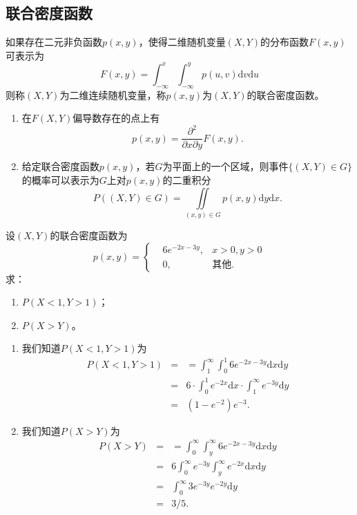 \subsection{联合密度函数}
 \begin{definition}
 如果存在二元非负函数$p(x,y)$，使得二维随机变量$(X,Y)$的分布函数$F(x,y)$可表示为$$F(x, y)=\int_{-\infty}^{x} \int_{-\infty}^{y} p(u, v) \text{d} v \text{d} u$$
 则称$(X,Y)$为二维连续随机变量，称$p(x,y)$为$(X,Y)$的联合密度函数。
  \end{definition}
  \begin{remark}
  \begin{enumerate}
      \item 在$F(X,Y)$偏导数存在的点上有
      $$p(x, y)=\frac{\partial^{2}}{\partial x \partial y} F(x, y) .$$
      \item 给定联合密度函数$p(x,y)$，若$G$为平面上的一个区域，则事件$\{(X,Y)\in G\}$的概率可以表示为$G$上对$p(x,y)$的二重积分
      $$
      P((X,Y) \in G)  = \underset{(x,y)\in G}{\iint} p(x,y)\text{d} y \text{d} x.
      $$
  \end{enumerate}
  \end{remark}
  \begin{example}
      设$(X,Y)$的联合密度函数为
      $$
      p(x,y) = \left\{
      \begin{aligned}
          & 6 e^{-2x - 3y}, & x>0,y>0\\
          &0 , & \text{其他}.
      \end{aligned}
      \right.
      $$
      求：
      \begin{enumerate}
          \item $P(X<1,Y>1)$；
          \item $P(X>Y)$。
      \end{enumerate}
  \end{example}
  \begin{solution}
       \begin{enumerate}
          \item 我们知道$P(X<1,Y>1)$为
          \begin{eqnarray*}
              P(X<1,Y>1) &=&= \int_{1}^{\infty}\int_{0}^1 6 e^{-2x - 3y} \text{d}x \text{d}y\\
              &=& 6\cdot \int_{0}^1 e^{-2x}\text{d}x \cdot \int_{1}^{\infty} e^{-3y}\text{d}y\\
              &=& (1-e^{-2})e^{-3}.
          \end{eqnarray*}
          \item 我们知道$P(X>Y)$为
          \begin{eqnarray*}
              P(X>Y) &=&= \int_{0}^{\infty}\int_{y}^\infty 6 e^{-2x - 3y} \text{d}x \text{d}y\\
              &=& 6\int_{0}^{\infty}e^{- 3y} \int_{y}^\infty  e^{-2x } \text{d}x \text{d}y\\
              &=& \int_{0}^{\infty}3e^{- 3y}e^{-2y}\text{d}y\\
              &=& 3/5.
          \end{eqnarray*}
      \end{enumerate}
  \end{solution}
